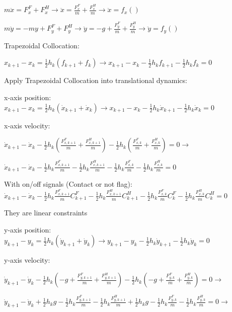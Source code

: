 \documentclass[a4paper,10pt]{article}
\begin{document}
$m\ddot{x} = F^F_x + F^H_x \rightarrow \ddot{x} = \frac{F^F_x}{m} + \frac{F^H_x}{m} \rightarrow \ddot{x} = f_x()$
\vspace{2mm}

$m\ddot{y} = -my + F^F_y + F^H_y \rightarrow \ddot{y} = -g + \frac{F^F_y}{m} + \frac{F^H_y}{m} \rightarrow \ddot{y} = f_y()$

\vspace{2mm}

Trapezoidal Collocation:

$x_{k+1}-x_k = \frac{1}{2}h_k(f_{k+1}+f_k) \rightarrow x_{k+1}-x_k-\frac{1}{2}h_kf_{k+1}-\frac{1}{2}h_kf_k = 0$

\vspace{2mm}

Apply Trapezoidal Collocation into translational dynamics:

x-axis position: $x_{k+1}-x_k=\frac{1}{2}h_k(\dot{x}_{k+1}+\dot{x}_k) \rightarrow x_{k+1}-x_k-\frac{1}{2}h_k\dot{x}_{k+1}-\frac{1}{2}h_k\dot{x}_k = 0$

x-axis velocity: 

$\dot{x}_{k+1}-\dot{x}_k-\frac{1}{2}h_k(\frac{F^F_{x,k+1}}{m}+\frac{F^H_{x,k+1}}{m})-\frac{1}{2}h_k(\frac{F^F_{x,k}}{m}+\frac{F^H_{x,k}}{m}) = 0 \rightarrow$

$\dot{x}_{k+1}-\dot{x}_k-\frac{1}{2}h_k\frac{F^F_{x,k+1}}{m}-\frac{1}{2}h_k\frac{F^H_{x,k+1}}{m}-\frac{1}{2}h_k\frac{F^F_{x,k}}{m}-\frac{1}{2}h_k\frac{F^H_{x,k}}{m} = 0$

With on/off signals (Contact or not flag):
$\dot{x}_{k+1}-\dot{x}_k-\frac{1}{2}h_k\frac{F^F_{x,k+1}}{m}C^F_{k+1}-\frac{1}{2}h_k\frac{F^H_{x,k+1}}{m}C^H_{k+1}-\frac{1}{2}h_k\frac{F^F_{x,k}}{m}C^F_{k}-\frac{1}{2}h_k\frac{F^H_{x,k}}{m}C^H_{k} = 0$

They are linear constraints

\vspace{3mm}

y-axis position: $y_{k+1}-y_k = \frac{1}{2}h_k(\dot{y}_{k+1}+\dot{y}_k) \rightarrow y_{k+1}-y_k-\frac{1}{2}h_k\dot{y}_{k+1}-\frac{1}{2}h_k\dot{y}_k = 0$

y-axis velocity:

$\dot{y}_{k+1}-\dot{y}_k-\frac{1}{2}h_k(-g+\frac{F^F_{y,k+1}}{m}+\frac{F^H_{y,k+1}}{m})-\frac{1}{2}h_k(-g+\frac{F^F_{y,k}}{m}+\frac{F^H_{y,k}}{m}) = 0 \rightarrow $

$\dot{y}_{k+1}-\dot{y}_k + \frac{1}{2}h_kg - \frac{1}{2}h_k\frac{F^F_{y,k+1}}{m} - \frac{1}{2}h_k\frac{F^H_{y,k+1}}{m} + \frac{1}{2}h_kg - \frac{1}{2}h_k\frac{F^F_{y,k}}{m} - \frac{1}{2}h_k\frac{F^H_{y,k}}{m} = 0 \rightarrow$
\end{document}

